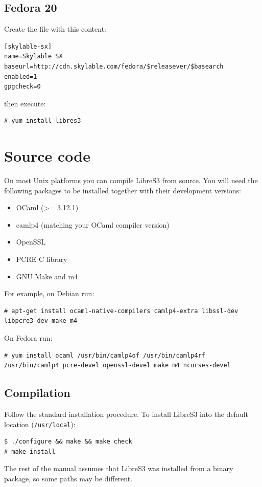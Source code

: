 \subsection{Fedora 20}
Create the file  with this content:
\begin{lstlisting}
[skylable-sx]
name=Skylable SX
baseurl=http://cdn.skylable.com/fedora/$releasever/$basearch
enabled=1
gpgcheck=0
\end{lstlisting}
then execute:
\begin{lstlisting}
# yum install libres3
\end{lstlisting}

\section*{Source code}

On most Unix platforms you can compile LibreS3
from source. You will need the following packages to be installed together with their
development versions:
\begin{itemize}
    \item OCaml (>= 3.12.1)
    \item camlp4 (matching your OCaml compiler version)
    \item OpenSSL
    \item PCRE C library
    \item GNU Make and m4
\end{itemize}
For example, on Debian run:

\begin{lstlisting}
# apt-get install ocaml-native-compilers camlp4-extra libssl-dev libpcre3-dev make m4
\end{lstlisting}

On Fedora run:

\begin{lstlisting}
# yum install ocaml /usr/bin/camlp4of /usr/bin/camlp4rf /usr/bin/camlp4 pcre-devel openssl-devel make m4 ncurses-devel
\end{lstlisting}


\newpage
\subsection*{Compilation}

Follow the standard installation procedure. To install
LibreS3 into the default location (\verb+/usr/local+):

\begin{lstlisting}
$ ./configure && make && make check
# make install
\end{lstlisting}
The rest of the manual assumes that LibreS3 was installed from a binary
package, so some paths may be different.

